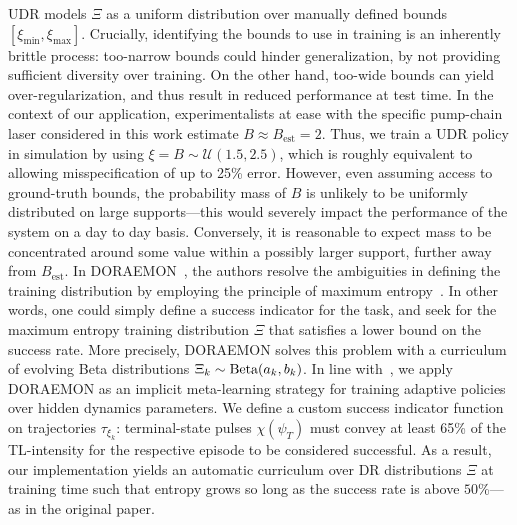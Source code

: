 UDR models \( \Xi \) as a uniform distribution over manually defined bounds \( [\xi_{\min}, \xi_{\max}] \).
Crucially, identifying the bounds to use in training is an inherently brittle process: too-narrow bounds could hinder generalization, by not providing sufficient diversity over training. On the other hand, too-wide bounds can yield over-regularization, and thus result in reduced performance at test time. In the context of our application, experimentalists at ease with the specific pump-chain laser considered in this work estimate \( B \approx B_{\text{est}} = 2 \). Thus, we train a UDR policy in simulation by using $\xi = B \sim \mathcal U(1.5, 2.5)$, which is roughly equivalent to allowing misspecification of up to 25\% error.
However, even assuming access to ground-truth bounds, the probability mass of \( B \) is unlikely to be uniformly distributed on large supports---this would severely impact the performance of the system on a day to day basis. Conversely, it is reasonable to expect mass to be concentrated around some value within a possibly larger support, further away from \( B_{\text{est}} \).
In DORAEMON~\cite{tiboni2023domain}, the authors resolve the ambiguities in defining the training distribution by employing the principle of maximum entropy~\citep{jaynes1957information}. In other words, one could simply define a success indicator for the task, and seek for the maximum entropy training distribution \( \Xi \) that satisfies a lower bound on the success rate.
%
More precisely, DORAEMON solves this problem with a curriculum of evolving Beta distributions \( \Xi_k \sim \text{Beta}(a_k, b_k) \).
In line with~\cite{tiboni2023domain}, we apply DORAEMON as an implicit meta-learning strategy for training adaptive policies over hidden dynamics parameters. We define a custom success indicator function on trajectories \( \tau_{\xi_k} \): terminal-state pulses \( \chi(\psi_T) \) must convey at least 65\% of the TL-intensity for the respective episode to be considered successful.
As a result, our implementation yields an automatic curriculum over DR distributions \( \Xi \) at training time such that entropy grows so long as the success rate is above \( 50 \)\%---as in the original paper.  
